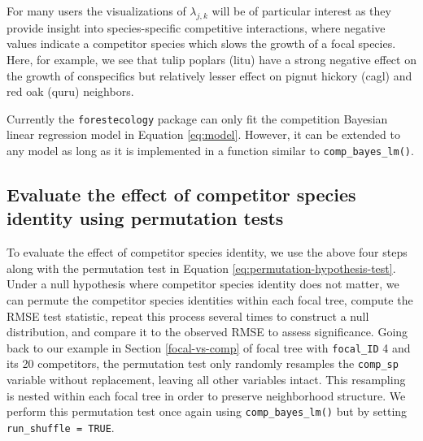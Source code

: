 \documentclass[12pt]{article}
\newenvironment{Shaded}{\begin{snugshade}}{\end{snugshade}}
\newcommand{\DataTypeTok}[1]{\textcolor[rgb]{0.13,0.29,0.53}{#1}}
\newcommand{\KeywordTok}[1]{\textcolor[rgb]{0.13,0.29,0.53}{\textbf{#1}}}
\newcommand{\NormalTok}[1]{#1}
\newcommand{\OperatorTok}[1]{\textcolor[rgb]{0.81,0.36,0.00}{\textbf{#1}}}
\newcommand{\OtherTok}[1]{\textcolor[rgb]{0.56,0.35,0.01}{#1}}
\newcommand{\StringTok}[1]{\textcolor[rgb]{0.31,0.60,0.02}{#1}}
\begin{document}
For many users the visualizations of \(\lambda_{j,k}\) will be of
particular interest as they provide insight into species-specific
competitive interactions, where negative values indicate a competitor
species which slows the growth of a focal species. Here, for example, we
see that tulip poplars (litu) have a strong negative effect on the
growth of conspecifics but relatively lesser effect on pignut hickory
(cagl) and red oak (quru) neighbors.

Currently the \texttt{forestecology} package can only fit the
competition Bayesian linear regression model in Equation \ref{eq:model}.
However, it can be extended to any model as long as it is implemented in
a function similar to \texttt{comp\_bayes\_lm()}.

\hypertarget{permutation-test}{%
\subsection{Evaluate the effect of competitor species identity using
permutation tests}\label{permutation-test}}

To evaluate the effect of competitor species identity, we use the above
four steps along with the permutation test in Equation
\ref{eq:permutation-hypothesis-test}. Under a null hypothesis where
competitor species identity does not matter, we can permute the
competitor species identities within each focal tree, compute the RMSE
test statistic, repeat this process several times to construct a null
distribution, and compare it to the observed RMSE to assess
significance. Going back to our example in Section \ref{focal-vs-comp}
of focal tree with \texttt{focal\_ID} 4 and its 20 competitors, the
permutation test only randomly resamples the \texttt{comp\_sp} variable
without replacement, leaving all other variables intact. This resampling
is nested within each focal tree in order to preserve neighborhood
structure. We perform this permutation test once again using
\texttt{comp\_bayes\_lm()} but by setting
\texttt{run\_shuffle\ =\ TRUE}.

\begin{Shaded}
\end{Shaded}
\end{document}
